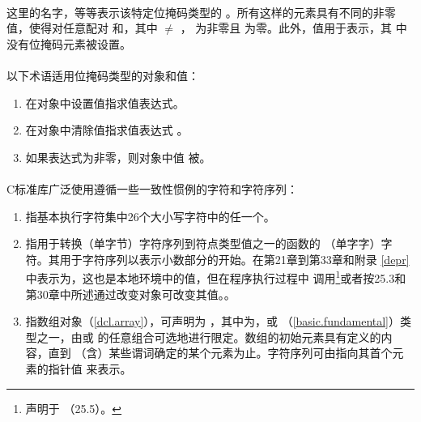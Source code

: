 \paragraph{}
这里的名字，等等表示该特定位掩码类型的
。所有这样的元素具有不同的非零值，使得对任意配对
和，其中 $\ne$ ，
为非零且
为零。此外，值用于表示，其
中没有位掩码元素被设置。

\paragraph{}
以下术语适用位掩码类型的对象和值：
\begin{enumerate}
  \item{在对象中设置值指求值表达式。}
  \item{在对象中清除值指求值表达式
    。}
  \item{如果表达式为非零，则对象中值
    被。}
\end{enumerate}

\paragraph{}
C标准库广泛使用遵循一些一致性惯例的字符和字符序列：
\begin{enumerate}
  \item{指基本执行字符集中26个大小写字符中的任一个。}
  \item{指用于转换（单字节）字符序列到符点类型值之一的函数的
    （单字字）字符。其用于字符序列以表示小数部分的开始。在第21章到第33章和附录
    \ref{depr}中表示为，这也是本地环境中的值，但在程序执行过程中
    调用\footnote{声明于
    （25.5）。}或者按25.3和第30章中所述通过改变对象可改变其值。}。
  \item{指数组对象（\ref{dcl.array}），可声明为
    ，其中为，或
    （\ref{basic.fundamental}）类型之一，由或
    的任意组合可选地进行限定。数组的初始元素具有定义的内容，直到
    （含）某些谓词确定的某个元素为止。字符序列可由指向其首个元素的指针值
    来表示。}
\end{enumerate}

